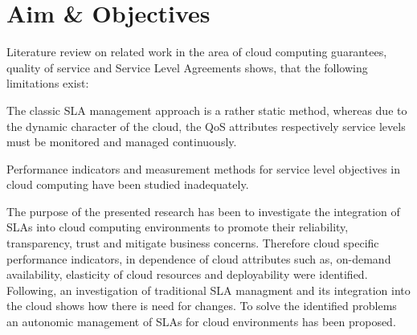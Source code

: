 \section{Aim \& Objectives}
Literature review on related work in the area of cloud computing guarantees, quality of service  and Service Level Agreements shows, that the following limitations exist:

The classic SLA management approach is a rather static method, whereas due to the dynamic character of the cloud, the QoS attributes respectively service levels must be monitored and managed continuously\cite{Ludwig03WSLA}.

Performance indicators\cite{5557978} and measurement methods for service level objectives in cloud computing have been studied inadequately\cite{Wieder2011}.

The purpose of the presented research has been to investigate the integration of SLAs into cloud computing environments to promote their reliability, transparency, trust and mitigate business concerns. Therefore cloud specific performance indicators, in dependence of cloud attributes such as, on-demand availability, elasticity of cloud resources and deployability were identified. Following, an investigation of traditional SLA managment and its integration into the cloud shows how there is need for changes. To solve the identified problems an autonomic management of SLAs for cloud environments has been proposed.



